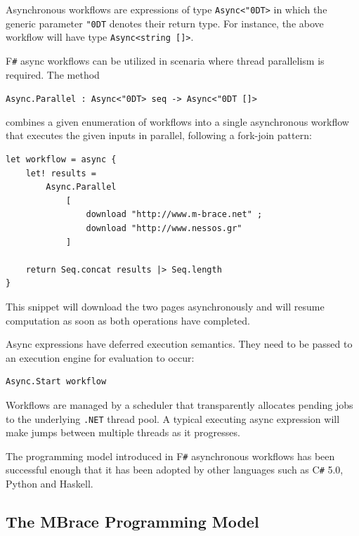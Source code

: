 \documentclass[9pt,a4paper]{article}
\newcommand{\TitularMbrace}{MBrace}
\newcommand{\fsharp}{F\texttt \#}
\newcommand{\csharp}{C\texttt \#}
\newcommand{\dotnet}{\texttt{\hbox{.}NET}}
\newcommand{\centertt}[1]{\begin{center}\texttt{#1}\end{center}}
\newcommand{\uq}{\char"0D}
\begin{document}
Asynchronous workflows are expressions of type \texttt{Async<\uq{}T>}
in which the generic parameter \texttt{\uq{}T} denotes their return type.
For instance, the above workflow will have type \texttt{Async<string []>}.

\fsharp{} async workflows can be utilized in scenaria where thread parallelism is required. 
The method
\centertt{Async.Parallel : Async<\uq{}T> seq -> Async<\uq{}T []>}
combines a given enumeration of workflows into a single asynchronous workflow 
that executes the given inputs in parallel, following a fork-join pattern:
\begin{lstlisting}
let workflow = async {
    let! results = 
        Async.Parallel 
			[ 
				download "http://www.m-brace.net" ;
				download "http://www.nessos.gr" 
			]
 
    return Seq.concat results |> Seq.length
}
\end{lstlisting}
This snippet will download the two pages asynchronously and will resume computation 
as soon as both operations have completed.

Async expressions have deferred execution semantics. They need to be passed to an
execution engine for evaluation to occur:
\begin{lstlisting} 
Async.Start workflow
\end{lstlisting}
Workflows are managed by a scheduler that transparently allocates pending jobs to the 
underlying \dotnet{} thread pool. A typical executing async expression will make jumps 
between multiple threads as it progresses.

The programming model introduced in \fsharp{} asynchronous workflows has been successful
enough that it has been adopted by other languages such as \csharp{} 5.0, Python and Haskell.

\subsection{The \TitularMbrace{} Programming Model}
\end{document}
